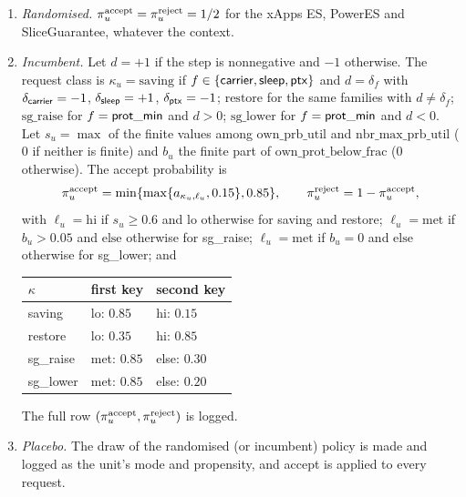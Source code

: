 \begin{definition}
\begin{enumerate}
\item \emph{Randomised.} $\pi_u^{\text{accept}} = \pi_u^{\text{reject}} = 1/2$ for the xApps ES, PowerES and SliceGuarantee, whatever the context.
\item \emph{Incumbent.} Let $d = +1$ if the step is nonnegative and $-1$ otherwise. The request class is $\kappa_u = \text{saving}$ if $f \in \{\mathsf{carrier}, \mathsf{sleep}, \mathsf{ptx}\}$ and $d = \delta_f$ with $\delta_{\mathsf{carrier}} = -1$, $\delta_{\mathsf{sleep}} = +1$, $\delta_{\mathsf{ptx}} = -1$; $\text{restore}$ for the same families with $d \neq \delta_f$; $\text{sg\_raise}$ for $f = \mathsf{prot\_min}$ and $d > 0$; $\text{sg\_lower}$ for $f = \mathsf{prot\_min}$ and $d < 0$. Let $s_u = \max$ of the finite values among $\mathrm{own\_prb\_util}$ and $\mathrm{nbr\_max\_prb\_util}$ ($0$ if neither is finite) and $b_u$ the finite part of $\mathrm{own\_prot\_below\_frac}$ ($0$ otherwise). The accept probability is
\begin{equation*}
\pi_u^{\text{accept}} = \min\{\max\{a_{\kappa_u, \ell_u}, 0.15\}, 0.85\}, \qquad \pi_u^{\text{reject}} = 1 - \pi_u^{\text{accept}},
\end{equation*}
with $\ell_u = \mathrm{hi}$ if $s_u \ge 0.6$ and $\mathrm{lo}$ otherwise for saving and restore; $\ell_u = \mathrm{met}$ if $b_u > 0.05$ and $\mathrm{else}$ otherwise for sg\_raise; $\ell_u = \mathrm{met}$ if $b_u = 0$ and $\mathrm{else}$ otherwise for sg\_lower; and
\begin{center}
\begin{tabular}{@{}lll@{}}
\toprule
$\kappa$ & first key & second key \\
\midrule
saving & lo: $0.85$ & hi: $0.15$ \\
restore & lo: $0.35$ & hi: $0.85$ \\
sg\_raise & met: $0.85$ & else: $0.30$ \\
sg\_lower & met: $0.85$ & else: $0.20$ \\
\bottomrule
\end{tabular}
\end{center}
The full row $(\pi_u^{\text{accept}}, \pi_u^{\text{reject}})$ is logged.
\item \emph{Placebo.} The draw of the randomised (or incumbent) policy is made and logged as the unit's mode and propensity, and accept is applied to every request.
\end{enumerate}
\end{definition}

